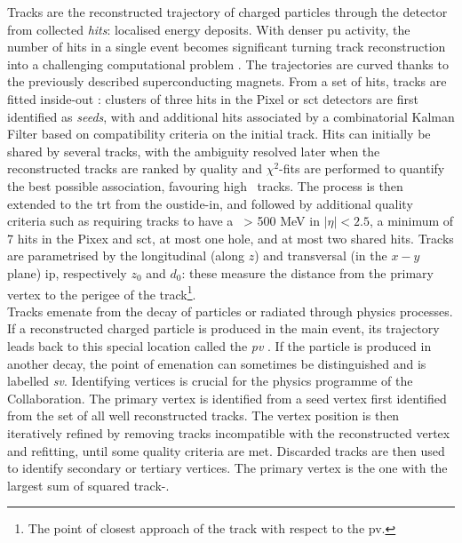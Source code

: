 Tracks are the reconstructed trajectory of charged particles through the detector from collected \textit{hits}: localised energy deposits. With denser \gls{pu} activity, the number of hits in a single event becomes significant turning track reconstruction into a challenging computational problem \cite{ATL-PHYS-PUB-2015-006, ATLAS-tracks-algo,}. The trajectories are curved thanks to the previously described superconducting magnets. From a set of hits, tracks are fitted inside-out \cite{ATLAS-tracks-algo}: clusters of three hits in the Pixel or \gls{sct} detectors are first identified as \textit{seeds}, with and additional hits associated by a combinatorial Kalman Filter \cite{10.1115/1.3662552} based on compatibility criteria on the initial track. Hits can initially be shared by several tracks, with the ambiguity resolved later when the reconstructed tracks are ranked by quality and $\chi^2$-fits are performed to quantify the best possible association, favouring high \pt\ tracks. The process is then extended to the \gls{trt} from the oustide-in, and followed by additional quality criteria such as requiring tracks to have a \pt\ > 500 MeV in $|\eta| < 2.5$, a minimum of 7 hits in the Pixex and \gls{sct}, at most one hole, and at most two shared hits. Tracks are parametrised by the longitudinal (along $z$) and transversal (in the $x-y$ plane) \gls{ip}, respectively $z_0$ and $d_0$: these measure the distance from the primary vertex to the perigee of the track\footnote{The point of closest approach of the track with respect to the \gls{pv}.}. \\

Tracks emenate from the decay of particles or radiated through physics processes. If a reconstructed charged particle is produced in the main event, its trajectory leads back to this special location called the \textit{pv} \cite{ATLAS:2016nnj}. If the particle is produced in another decay, the point of emenation can sometimes be distinguished and is labelled \textit{\gls{sv}}. Identifying vertices is crucial for the physics programme of the Collaboration. The primary vertex is identified from a seed vertex first identified from the set of all well reconstructed tracks. The vertex position is then iteratively refined by removing tracks incompatible with the reconstructed vertex and refitting, until some quality criteria are met. Discarded tracks are then used to identify secondary or tertiary vertices. The primary vertex is the one with the largest sum of squared track-\pt. \\


